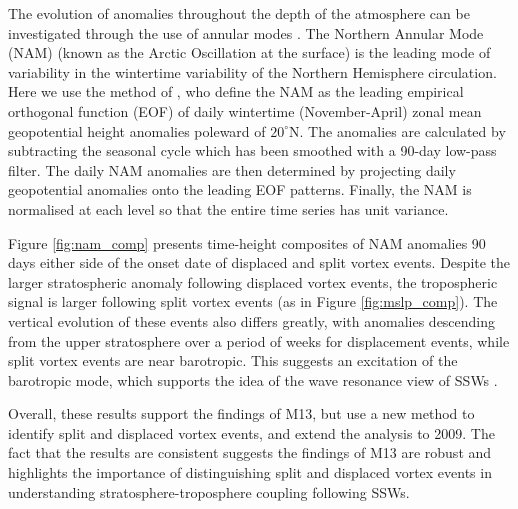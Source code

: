 The evolution of anomalies throughout the depth of the atmosphere can be
investigated through the use of annular modes \citep[e.g.][]{Baldwin2001a}. The
Northern Annular Mode (NAM) (known as the Arctic Oscillation at the surface) is
the leading mode of variability in the wintertime variability of the Northern
Hemisphere circulation. Here we use the method of \citep{Baldwin2009}, who
define the NAM as the leading empirical orthogonal function (EOF) of daily
wintertime (November-April) zonal mean geopotential height anomalies poleward of
$20^{\circ}$N. The anomalies are calculated by subtracting the seasonal cycle
which has been smoothed with a 90-day low-pass filter. The daily NAM anomalies
are then determined by projecting daily geopotential anomalies onto the leading
EOF patterns. Finally, the NAM is normalised at each level so that the entire
time series has unit variance.

Figure \ref{fig:nam_comp} presents time-height composites of NAM anomalies 90
days either side of the onset date of displaced and split vortex events. Despite
the larger stratospheric anomaly following displaced vortex events, the
tropospheric signal is larger following split vortex events (as in Figure
\ref{fig:mslp_comp}). The vertical evolution of these events also differs
greatly, with anomalies descending from the upper stratosphere over a period of
weeks for displacement events, while split vortex events are near
barotropic. This suggests an excitation of the barotropic mode, which supports
the idea of the wave resonance view of SSWs \citep{Esler2005}.

Overall, these results support the findings of M13, but use a new method to
identify split and displaced vortex events, and extend the analysis to 2009. The
fact that the results are consistent suggests the findings of M13 are robust and
highlights the importance of distinguishing split and displaced vortex events in
understanding stratosphere-troposphere coupling following SSWs.













